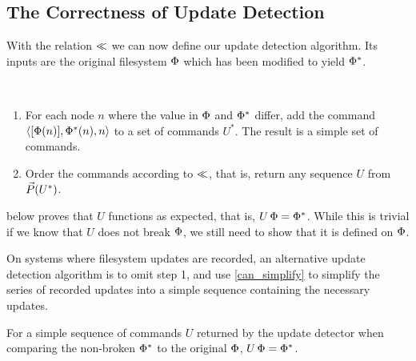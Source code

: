 
\subsection{The Correctness of Update Detection}

With the relation $\ll$ we can now define our update detection algorithm.
Its inputs are the original filesystem $\Phi$ which has been modified to yield $\Phi^*$.
\begin{mydef}~
\begin{enumerate}
    \item For each node $n$ where the value in $\Phi$ and $\Phi^*$ differ, add the command $\langle{[\Phi(n)],\Phi^*(n),n}\rangle$ to
        a set of commands $U^*$. The result is a simple set of commands.
    \item Order the commands according to $\ll$, that is, 
        return any sequence $U$ from $\vec{P}({U^*})$. \qedhere
\end{enumerate}
\end{mydef}

 below proves that $U$ functions as expected, that is, $U\,\Phi=\Phi^*$.
While this is trivial if we know that $U$ does not break $\Phi$, we
still need to show that it is defined on $\Phi$.

On systems where filesystem updates are recorded,
an alternative update detection algorithm is to
omit step 1, and use \cref{can_simplify} to simplify the series of recorded updates
into a simple sequence containing the necessary updates.

\begin{myth}
For a simple sequence of commands $U$ returned by the update detector
when comparing the non-broken $\Phi^*$ to the original $\Phi$,
$U\,\Phi = \Phi^*$.
\end{myth}

